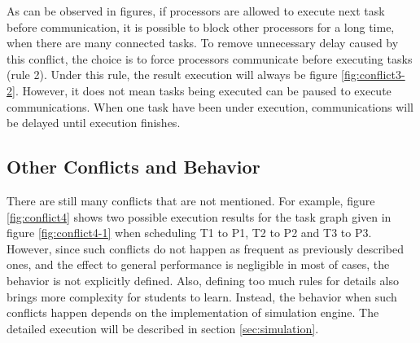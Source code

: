 \documentclass[msc,deptreport, cs]{infthesis}
\begin{document}
As can be observed in figures, if processors are allowed to execute next task before communication, it is possible to block other processors for a long time, when there are many connected tasks. To remove unnecessary delay caused by this conflict, the choice is to force processors communicate before executing tasks (rule 2). Under this rule, the result execution will always be figure \ref{fig:conflict3-2}. However, it does not mean tasks being executed can be paused to execute communications. When one task have been under execution, communications will be delayed until execution finishes.

\subsection{Other Conflicts and Behavior} \label{sec:conflict}

There are still many conflicts that are not mentioned. For example, figure \ref{fig:conflict4} shows two possible execution results for the task graph given in figure \ref{fig:conflict4-1} when scheduling T1 to P1, T2 to P2 and T3 to P3. However, since such conflicts do not happen as frequent as previously described ones, and the effect to general performance is negligible in most of cases, the behavior is not explicitly defined. Also, defining too much rules for details also brings more complexity for students to learn. Instead, the behavior when such conflicts happen depends on the implementation of simulation engine. The detailed execution will be described in section \ref{sec:simulation}.
\end{document}
